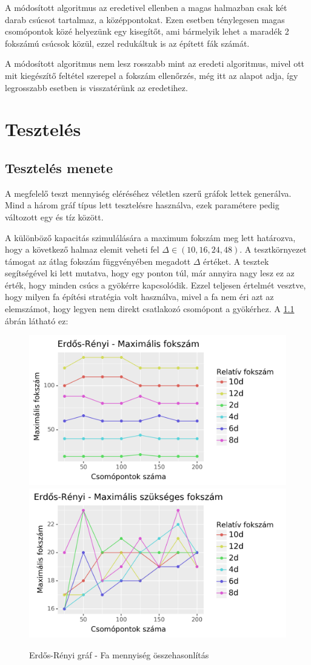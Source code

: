 \documentclass[12pt]{report}
\begin{document}
A módosított algoritmus az eredetivel ellenben a magas halmazban csak két darab csúcsot tartalmaz, a középpontokat.
Ezen esetben ténylegesen magas csomópontok közé helyezünk egy kisegítőt, ami bármelyik lehet a maradék 2 fokszámú csúcsok közül, ezzel redukáltuk is az épített fák számát.

A módosított algoritmus nem lesz rosszabb mint az eredeti algoritmus, mivel ott mit kiegészítő feltétel szerepel a fokszám ellenőrzés, még itt az alapot adja, így legrosszabb esetben is visszatérünk az eredetihez. 

\chapter{Tesztelés}


\section{Tesztelés menete}

A megfelelő teszt mennyiség eléréséhez véletlen szerű gráfok lettek generálva. 
Mind a három gráf típus lett tesztelésre használva, ezek paramétere pedig változott egy és tíz között.

A különböző kapacitás szimulálására a maximum fokszám meg lett határozva, hogy a 
következő halmaz elemit veheti fel $\Delta\in(10, 16, 24, 48)$.
A tesztkörnyezet támogat az átlag fokszám függvényében megadott $\Delta$ értéket. 
A tesztek segítségével ki lett mutatva, hogy egy ponton túl, már annyira nagy lesz ez az érték, hogy minden csúcs a gyökérre kapcsolódik.
Ezzel teljesen értelmét vesztve, hogy milyen fa építési stratégia volt használva, mivel a fa nem éri azt az elemszámot, hogy legyen nem direkt csatlakozó csomópont a gyökérhez. 
A \ref{delta} ábrán látható ez:  

\begin{figure}[H]
	\begin{center}
		\includegraphics[width=0.49\linewidth]{pictures/delta_max.png}
		\includegraphics[width=0.49\linewidth]{pictures/delta_req.png}
		\caption{Erdős-Rényi gráf - Fa mennyiség összehasonlítás}
		\label{delta}
	\end{center}
\end{figure}
\end{document}
